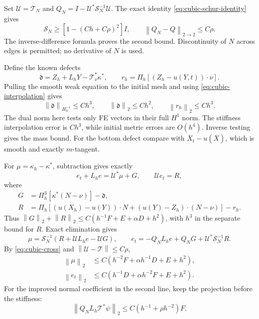 \documentclass[11pt,a4paper]{article}
\numberwithin{equation}{section}
\theoremstyle{remark}
\newcommand{\norm}[1]{\left\lVert #1\right\rVert}
\begin{document}
Set \(\mathcal U=\mathcal T_N\) and
\(Q_N=I-\mathcal U^*\mathcal S_N^{-1}\mathcal U\).
The exact identity \eqref{eq:cubic-schur-identity} gives
\begin{equation}\label{eq:cubic-actual-schur}
 \mathcal S_N\geq[1-(Ch+C\rho)^2]I,
 \qquad\norm{Q_N-Q}_{2\to2}\leq C\rho .
\end{equation}
The inverse-difference formula proves the second bound. Discontinuity
of \(N\) across edges is permitted; no derivative of \(N\) is used.

Define the known defects
\[
 \mathfrak d=Z_h+L_hY-\mathcal T_\nu^*\kappa^*,\qquad
 r_h=\Pi_h[(Z_h-u(Y,t))\cdot\nu].
\]
Pulling the smooth weak equation to the initial mesh and using
\eqref{eq:cubic-interpolation} gives
\begin{equation}\label{eq:cubic-defects}
 \norm{\mathfrak d}_{H_h^{-1}}\leq Ch^3,
 \qquad\norm{\mathfrak d}_2\leq Ch^2,
 \qquad\norm{r_h}_2\leq Ch^3.
\end{equation}
The dual norm here tests only FE vectors in their full \(H^1\) norm.
The stiffness interpolation error is \(Ch^3\), while initial metric
errors are \(O(h^4)\). Inverse testing gives the mass bound. For the
bottom defect compare with \(\overline X_t-u(\overline X)\), which is
smooth and exactly \(m\)-tangent.

For \(\mu=\kappa_h-\kappa^*\), subtraction gives exactly
\begin{equation}\label{eq:cubic-error}
 e_t+L_he=\mathcal U^*\mu+G,\qquad\mathcal Ue_t=R,
\end{equation}
where
\[
 \begin{split}
 G&=\Pi_h^3[\kappa^*(N-\nu)]-\mathfrak d,\\
 R&=\Pi_h[(u(X_h)-u(Y))\cdot N
               +(u(Y)-Z_h)\cdot(N-\nu)]-r_h .
 \end{split}
\]
Thus \(\norm G_2+\norm R_2\leq C(h^{-1}F+E+\alpha D+h^2)\),
with \(h^3\) in the separate bound for \(R\).
Exact elimination gives
\[
 \mu=\mathcal S_N^{-1}(R+\mathcal UL_he-\mathcal UG),\qquad
 e_t=-Q_NL_he+Q_NG+\mathcal U^*\mathcal S_N^{-1}R .
\]
By \eqref{eq:cubic-cross} and
\(\norm{\mathcal U-\mathcal T}\leq C\rho\),
\begin{equation}\label{eq:cubic-mixed-bounds}
 \begin{split}
 \norm\mu_2&\leq C(h^{-2}F+\alpha h^{-1}D+E+h^2),\\
 \norm{e_t}_2&\leq C(h^{-1}D+\alpha h^{-2}F+E+h^2).
 \end{split}
\end{equation}
For the improved normal coefficient in the second line, keep the
projection before the stiffness:
\[
 \norm{Q_NL_h\mathcal T^*\psi}_2
       \leq C(h^{-1}+\rho h^{-2})F.
\]
\end{document}
